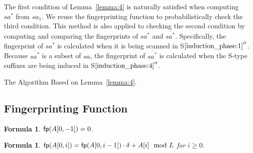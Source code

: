 \documentclass[10pt,journal,compsoc]{IEEEtran}
\newtheorem{formula}[theorem]{Formula}
\begin{document}
The first condition of Lemma~\ref{lemma:4} is naturally satisfied when computing $sa^*$ from $sa_1$. We reuse the fingerprinting function to probabilistically check the third condition. This method is also applied to checking the second condition by computing and comparing the fingerprints of $sa^*$ and $\overline{sa^*}$. Specifically, the fingerprint of $sa^*$ is calculated when it is being scanned in S$\ref{induction_phase:1}''$. Because $\overline{sa^*}$ is a subset of $sa$, the fingerprint of $\overline{sa^*}$ is calculated when the S-type suffixes are being induced in S$\ref{induction_phase:4}''$.


\begin{algorithm*}

	\caption{The Algorithm Based on Lemma~\ref{lemma:4}.}
	
	\label{alg:3}
	
\end{algorithm*}


\subsection{Fingerprinting Function}

\begin{formula} \label{formula:1}${\sf fp}(A[0, -1]) = 0$.
\end{formula}

\begin{formula} \label{formula:2}${\sf fp}(A[0, i]) = {\sf fp}(A[0, i - 1]) \cdot {\delta} + A[i]\mod L$ for $i \ge 0$.
\end{formula}
\end{document}
